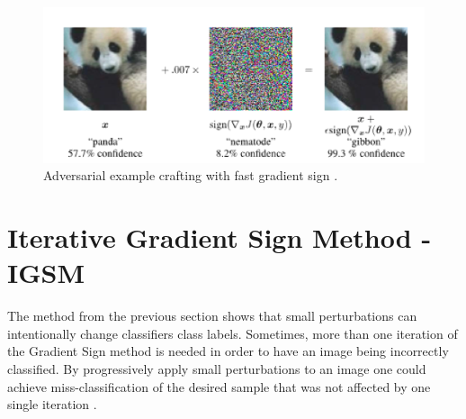 \begin{figure}[!h]
\centering
	\includegraphics[scale=0.6]{panda.png}
\caption{Adversarial example crafting with fast gradient sign \cite{goodfellow2014}.}
\label{fig:fgsm_craft}
\end{figure}

\section{Iterative Gradient Sign Method - IGSM}

The method from the previous section shows that small perturbations can intentionally change classifiers class labels. Sometimes, more than one iteration of the Gradient Sign method is needed in order to have an image being incorrectly classified. By progressively apply small perturbations to an image one could achieve miss-classification of the desired sample that was not affected by one single iteration \cite{goodfellow2016}. 

